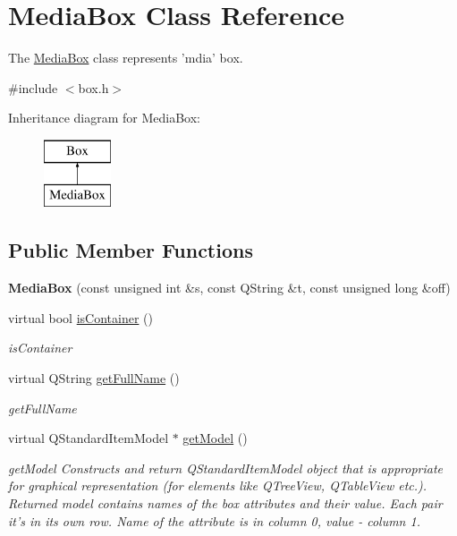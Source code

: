 \hypertarget{class_media_box}{\section{Media\-Box Class Reference}
\label{class_media_box}
}


The \hyperlink{class_media_box}{Media\-Box} class represents 'mdia' box.  




{\ttfamily \#include $<$box.\-h$>$}

Inheritance diagram for Media\-Box\-:\begin{figure}[H]
\begin{center}
\leavevmode
\includegraphics[height=2.000000cm]{class_media_box}
\end{center}
\end{figure}
\subsection*{Public Member Functions}
\begin{DoxyCompactItemize}
\item 
\hypertarget{class_media_box_a0a69119d88934b49b081c950efdf5a1e}{{\bfseries Media\-Box} (const unsigned int \&s, const Q\-String \&t, const unsigned long \&off)}\label{class_media_box_a0a69119d88934b49b081c950efdf5a1e}

\item 
virtual bool \hyperlink{class_media_box_a425be0e4e5c7bd559cea7e313da94e2d}{is\-Container} ()
\begin{DoxyCompactList}\small\item\em is\-Container \end{DoxyCompactList}\item 
virtual Q\-String \hyperlink{class_media_box_a1fc835d61029b900e874039e2d29216e}{get\-Full\-Name} ()
\begin{DoxyCompactList}\small\item\em get\-Full\-Name \end{DoxyCompactList}\item 
virtual Q\-Standard\-Item\-Model $\ast$ \hyperlink{class_media_box_a3e4eae22e99bddfbcaac8c2950c542a1}{get\-Model} ()
\begin{DoxyCompactList}\small\item\em get\-Model Constructs and return Q\-Standard\-Item\-Model object that is appropriate for graphical representation (for elements like Q\-Tree\-View, Q\-Table\-View etc.). Returned model contains names of the box attributes and their value. Each pair it's in its own row. Name of the attribute is in column 0, value -\/ column 1. \end{DoxyCompactList}\end{DoxyCompactItemize}
